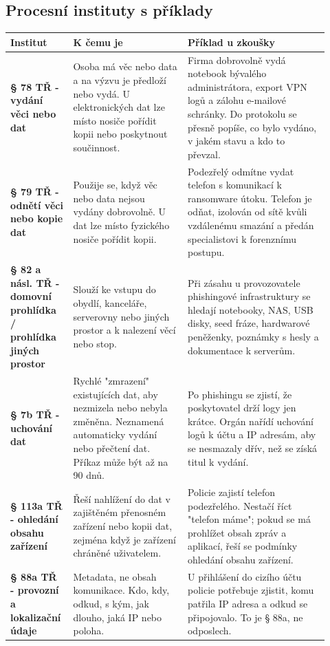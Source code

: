 \subsection*{Procesní instituty s příklady}
\begin{longtable}{p{0.16\linewidth}p{0.34\linewidth}p{0.42\linewidth}}
\toprule
\textbf{Institut} & \textbf{K čemu je} & \textbf{Příklad u zkoušky}\\
\midrule
\textbf{§ 78 TŘ - vydání věci nebo dat} & Osoba má věc nebo data a na výzvu je předloží nebo vydá. U elektronických dat lze místo nosiče pořídit kopii nebo poskytnout součinnost. & Firma dobrovolně vydá notebook bývalého administrátora, export VPN logů a zálohu e-mailové schránky. Do protokolu se přesně popíše, co bylo vydáno, v jakém stavu a kdo to převzal.\\
\addlinespace
\textbf{§ 79 TŘ - odnětí věci nebo kopie dat} & Použije se, když věc nebo data nejsou vydány dobrovolně. U dat lze místo fyzického nosiče pořídit kopii. & Podezřelý odmítne vydat telefon s komunikací k ransomware útoku. Telefon je odňat, izolován od sítě kvůli vzdálenému smazání a předán specialistovi k forenznímu postupu.\\
\addlinespace
\textbf{§ 82 a násl. TŘ - domovní prohlídka / prohlídka jiných prostor} & Slouží ke vstupu do obydlí, kanceláře, serverovny nebo jiných prostor a k nalezení věcí nebo stop. & Při zásahu u provozovatele phishingové infrastruktury se hledají notebooky, NAS, USB disky, seed fráze, hardwarové peněženky, poznámky s hesly a dokumentace k serverům.\\
\addlinespace
\textbf{§ 7b TŘ - uchování dat} & Rychlé "zmrazení" existujících dat, aby nezmizela nebo nebyla změněna. Neznamená automaticky vydání nebo přečtení dat. Příkaz může být až na 90 dnů. & Po phishingu se zjistí, že poskytovatel drží logy jen krátce. Orgán nařídí uchování logů k účtu a IP adresám, aby se nesmazaly dřív, než se získá titul k vydání.\\
\addlinespace
\textbf{§ 113a TŘ - ohledání obsahu zařízení} & Řeší nahlížení do dat v zajištěném přenosném zařízení nebo kopii dat, zejména když je zařízení chráněné uživatelem. & Policie zajistí telefon podezřelého. Nestačí říct "telefon máme"; pokud se má prohlížet obsah zpráv a aplikací, řeší se podmínky ohledání obsahu zařízení.\\
\addlinespace
\textbf{§ 88a TŘ - provozní a lokalizační údaje} & Metadata, ne obsah komunikace. Kdo, kdy, odkud, s kým, jak dlouho, jaká IP nebo poloha. & U přihlášení do cizího účtu policie potřebuje zjistit, komu patřila IP adresa a odkud se připojovalo. To je § 88a, ne odposlech.\\

\end{longtable}
